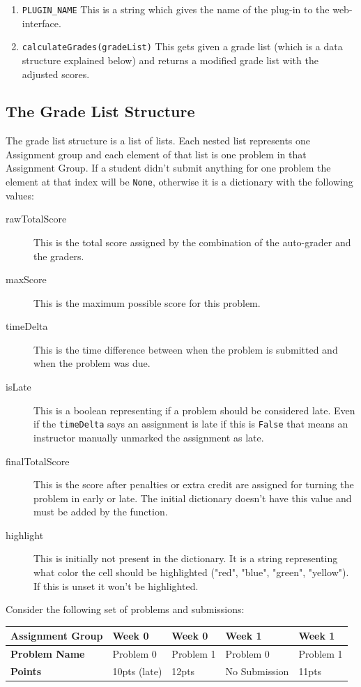 \documentclass[11pt]{report}
\begin{document}
\begin{enumerate}
\item \texttt{PLUGIN\_NAME} This is a string which gives the name of the plug-in to the web-interface.
\item \texttt{calculateGrades(gradeList)} This gets given a grade list (which is a data structure explained
below) and returns a modified grade list with the adjusted scores. 
\end{enumerate}

\subsection{The Grade List Structure}

The grade list structure is a list of lists. Each nested list represents one Assignment group and each
element of that list is one problem in that Assignment Group. If a student didn't submit anything for 
one problem the element at that index will be \texttt{None}, otherwise it is a dictionary with the
following values:

\begin{description}
\item[rawTotalScore] This is the total score assigned by the combination of the auto-grader and the graders.
\item[maxScore] This is the maximum possible score for this problem.
\item[timeDelta] This is the time difference between when the problem is submitted and when the problem was
due. 
\item[isLate] This is a boolean representing if a problem should be considered late. Even if the 
\texttt{timeDelta} says an assignment is late if this is \texttt{False} that means an instructor manually
unmarked the assignment as late.
\item[finalTotalScore] This is the score after penalties or extra credit are assigned for turning the problem
in early or late. The initial dictionary doesn't have this value and must be added by the function.
\item[highlight] This is initially not present in the dictionary. It is a string representing what 
color the cell should be highlighted ("red", "blue", "green", "yellow"). If this is unset it won't be 
highlighted. 
\end{description}

Consider the following set of problems and submissions:

\begin{tabular}{|l|l|l|l|l|}
\hline
	\textbf{Assignment Group} & Week 0 & Week 0 & Week 1 & Week 1\\
\hline
	\textbf{Problem Name} & Problem 0 & Problem 1 & Problem 0 & Problem 1\\
\hline
	\textbf{Points} & 10pts (late) & 12pts & No Submission & 11pts\\
\hline
\end{tabular}
\end{document}
